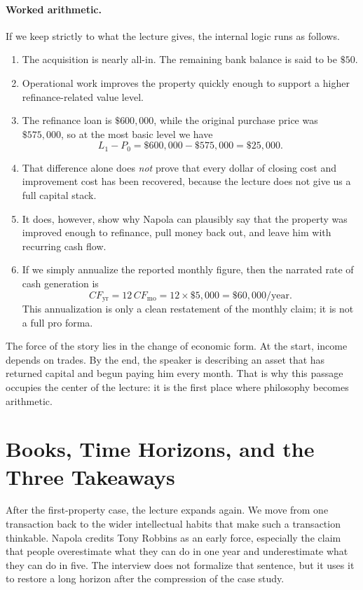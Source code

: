 \paragraph{Worked arithmetic.}
If we keep strictly to what the lecture gives, the internal logic runs as follows.
\begin{enumerate}
\item The acquisition is nearly all-in. The remaining bank balance is said to be \(\$50\).
\item Operational work improves the property quickly enough to support a higher refinance-related value level.
\item The refinance loan is \(\$600{,}000\), while the original purchase price was \(\$575{,}000\), so at the most basic level we have
\begin{equation}
L_1 - P_0 = \$600{,}000 - \$575{,}000 = \$25{,}000.
\end{equation}
\item That difference alone does \emph{not} prove that every dollar of closing cost and improvement cost has been recovered, because the lecture does not give us a full capital stack.
\item It does, however, show why Napola can plausibly say that the property was improved enough to refinance, pull money back out, and leave him with recurring cash flow.
\item If we simply annualize the reported monthly figure, then the narrated rate of cash generation is
\begin{equation}
CF_{\text{yr}} = 12\,CF_{\text{mo}} = 12 \times \$5{,}000 = \$60{,}000/\text{year}.
\end{equation}
This annualization is only a clean restatement of the monthly claim; it is not a full pro forma.
\end{enumerate}

The force of the story lies in the change of economic form. At the start, income depends on trades. By the end, the speaker is describing an asset that has returned capital and begun paying him every month. That is why this passage occupies the center of the lecture: it is the first place where philosophy becomes arithmetic.

\section{Books, Time Horizons, and the Three Takeaways}

After the first-property case, the lecture expands again. We move from one transaction back to the wider intellectual habits that make such a transaction thinkable. Napola credits Tony Robbins as an early force, especially the claim that people overestimate what they can do in one year and underestimate what they can do in five. The interview does not formalize that sentence, but it uses it to restore a long horizon after the compression of the case study.

